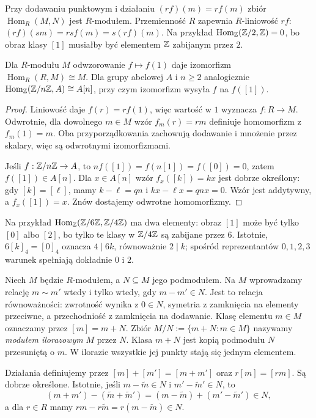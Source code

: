 Przy dodawaniu punktowym i działaniu $(rf)(m)=r f(m)$
zbiór $\operatorname{Hom}_R(M,N)$ jest $R$-modułem.
Przemienność $R$ zapewnia $R$-liniowość $rf$:
$(rf)(sm)=rsf(m)=s(rf)(m)$.
Na przykład $\operatorname{Hom}_{\mathbb{Z}}(\mathbb{Z}/2,\mathbb{Z})=0$,
bo obraz klasy $[1]$ musiałby być elementem $\mathbb{Z}$ zabijanym przez $2$.

\begin{stwierdzenie}
\label{prop:hom-cyclic-5}
Dla $R$-modułu $M$ odwzorowanie $f\mapsto f(1)$ daje
izomorfizm $\operatorname{Hom}_R(R,M)\cong M$.
Dla grupy abelowej $A$ i $n\geq2$ analogicznie
$\operatorname{Hom}_{\mathbb{Z}}(\mathbb{Z}/n\mathbb{Z},A)\cong A[n]$,
przy czym izomorfizm wysyła $f$ na $f([1])$.
\end{stwierdzenie}
\begin{proof}
Liniowość daje $f(r)=rf(1)$, więc wartość w $1$
wyznacza $f:R\to M$. Odwrotnie, dla dowolnego $m\in M$
wzór $f_m(r)=rm$ definiuje homomorfizm z $f_m(1)=m$.
Oba przyporządkowania zachowują dodawanie i mnożenie
przez skalary, więc są odwrotnymi izomorfizmami.

Jeśli $f:\mathbb{Z}/n\mathbb{Z}\to A$, to
$nf([1])=f(n[1])=f([0])=0$, zatem $f([1])\in A[n]$.
Dla $x\in A[n]$ wzór $f_x([k])=kx$ jest dobrze określony:
gdy $[k]=[\ell]$, mamy $k-\ell=qn$ i
$kx-\ell x=qn x=0$. Wzór jest addytywny,
a $f_x([1])=x$. Znów dostajemy odwrotne homomorfizmy.
\end{proof}

Na przykład $\operatorname{Hom}_{\mathbb{Z}}(\mathbb{Z}/6\mathbb{Z},\mathbb{Z}/4\mathbb{Z})$
ma dwa elementy: obraz $[1]$ może być tylko $[0]$
albo $[2]$, bo tylko te klasy w $\mathbb{Z}/4\mathbb{Z}$ są
zabijane przez $6$. Istotnie, $6[k]_4=[0]_4$ oznacza
$4\mid6k$, równoważnie $2\mid k$; spośród reprezentantów
$0,1,2,3$ warunek spełniają dokładnie $0$ i $2$.

\begin{definicja}
\label{def:modul-ilorazowy}
Niech $M$ będzie $R$-modułem, a $N\subseteq M$ jego podmodułem.
Na $M$ wprowadzamy relację $m\sim m'$ wtedy i tylko wtedy,
gdy $m-m'\in N$. Jest to relacja równoważności:
zwrotność wynika z $0\in N$, symetria z zamknięcia na
elementy przeciwne, a przechodniość z zamknięcia na dodawanie.
Klasę elementu $m\in M$ oznaczamy przez $[m]=m+N$.
Zbiór $M/N:=\{m+N:m\in M\}$ nazywamy
\emph{modułem ilorazowym} $M$ przez $N$.
Klasa $m+N$ jest kopią podmodułu $N$ przesuniętą o $m$.
W ilorazie wszystkie jej punkty stają się jednym elementem.

Działania definiujemy przez $[m]+[m']=[m+m']$ oraz
$r[m]=[rm]$. Są dobrze określone. Istotnie, jeśli
$m-\widetilde m\in N$ i $m'-\widetilde m'\in N$, to
\[
(m+m')-(\widetilde m+\widetilde m')
=
(m-\widetilde m)+(m'-\widetilde m')
\in N,
\]
a dla $r\in R$ mamy $rm-r\widetilde m=r(m-\widetilde m)\in N$.
\end{definicja}

